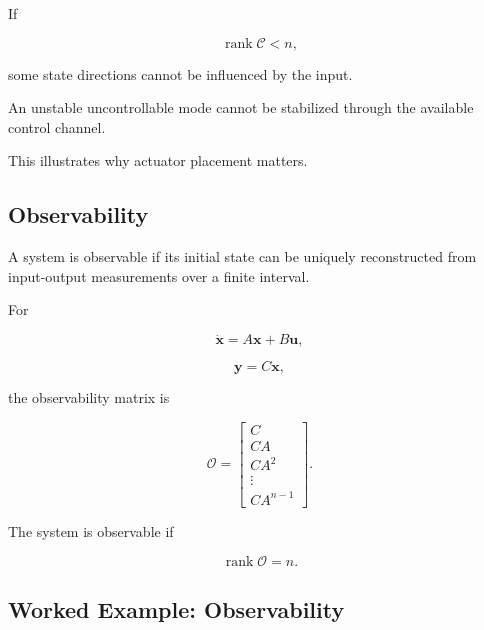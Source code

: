 If

\[
\operatorname{rank}\mathcal{C}<n,
\]

some state directions cannot be influenced by the input.

An unstable uncontrollable mode cannot be stabilized through the available
control channel.

This illustrates why actuator placement matters.

\subsection{Observability}
\label{subsec:observability}

A system is observable if its initial state can be uniquely reconstructed
from input-output measurements over a finite interval.

For

\[
\dot{\mathbf{x}}
=
A\mathbf{x}
+
B\mathbf{u},
\]

\[
\mathbf{y}
=
C\mathbf{x},
\]

the observability matrix is

\[
\boxed{
\mathcal{O}
=
\begin{bmatrix}
C\\
CA\\
CA^2\\
\vdots\\
CA^{n-1}
\end{bmatrix}.
}
\]

The system is observable if

\[
\boxed{
\operatorname{rank}\mathcal{O}=n.
}
\]

\subsection{Worked Example: Observability}
\label{subsec:worked-observability}

